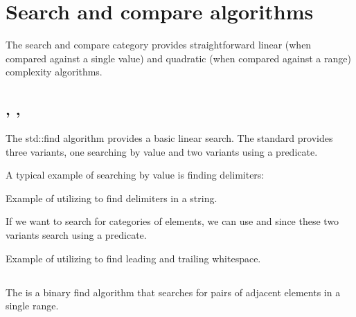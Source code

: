 \section{Search and compare algorithms}

The search and compare category provides straightforward linear (when compared against a single value) and quadratic (when compared against a range) complexity algorithms.

\subsection{\texorpdfstring{, , }{\texttt{std::find}, \texttt{std::find\_if}, \texttt{std::find\_if\_not}}}

The std::find algorithm provides a basic linear search. The standard provides three variants, one searching by value and two variants using a predicate.



A typical example of searching by value is finding delimiters:

\begin{box-note}
\footnotesize Example of utilizing  to find delimiters in a string.
\tcblower
{}
\end{box-note}

If we want to search for categories of elements, we can use  and  since these two variants search using a predicate.

\begin{box-note}
\footnotesize Example of utilizing  to find leading and trailing whitespace.
\tcblower
{}
\end{box-note}

\subsection{\texorpdfstring{}{\texttt{std::adjacent\_find}}}

The  is a binary find algorithm that searches for pairs of adjacent elements in a single range.

